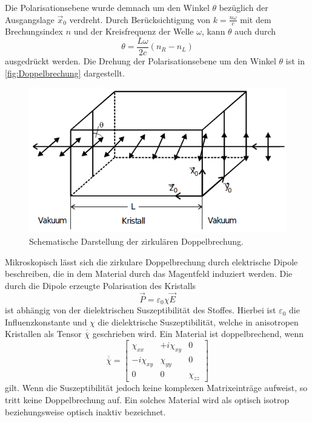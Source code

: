 Die Polarisationsebene wurde demnach um den Winkel $\theta$ bezüglich der Ausgangslage $\vec{x}_0$ verdreht. Durch
Berücksichtigung von $k=\frac{n \omega}{c}$ mit dem Brechungsindex $n$ und der Kreisfrequenz der Welle $\omega$,
kann $\theta$ auch durch 
\begin{equation*}
    \theta=\frac{L\omega}{2c}(n_R-n_L)
\end{equation*}
ausgedrückt werden. Die Drehung der Polarisationsebene um den Winkel $\theta$ ist in \autoref{fig:Doppelbrechung} dargestellt.

\begin{figure}[H]
    \centering
    \includegraphics[scale=0.7]{Abbildungen/Doppelbrechung.png}
    \caption{Schematische Darstellung der zirkulären Doppelbrechung.\cite{V46_Anhang}}
    \label{fig:Doppelbrechung}
\end{figure}

Mikroskopisch lässt sich die zirkulare Doppelbrechung durch elektrische Dipole beschreiben, die in dem Material durch das 
Magentfeld induziert werden. Die durch die Dipole erzeugte Polarisation des Kristalls 
\begin{equation*}
    \vec{P}=\varepsilon_0\chi\vec{E}
\end{equation*}
ist abhängig von der dielektrischen Suszeptibilität des Stoffes. Hierbei ist $\varepsilon_0$ die Influenzkonstante und $\chi$ die
dielektrische Suszeptibilität, welche in anisotropen Kristallen als Tensor $\overline{\overline{\chi}}$ geschrieben wird.
Ein Material ist doppelbrechend, wenn
\begin{equation}
    \overline{\overline{\chi}}=
    \left[
        \begin{array}{ccc}
        \chi_{xx}          & +i\chi_{xy} & 0         \\ 
        -i\chi_{xy}   & \chi_{yy}        & 0         \\
        0                  & 0                & \chi_{zz}
    \end{array}
    \right]
    \label{eqn:chi}
\end{equation}
gilt.
Wenn die Suszeptibilität jedoch keine komplexen Matrixeinträge aufweist, so tritt keine Doppelbrechung auf.
Ein solches Material wird als optisch isotrop beziehungsweise optisch inaktiv bezeichnet. 



